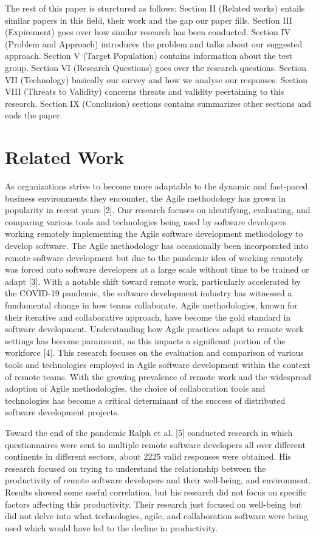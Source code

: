 \documentclass[conference]{IEEEtran}
\begin{document}
The rest of this paper is sturctured as follows: Section II (Related works) entails similar papers in this field, their work and the gap our paper fills. Section III (Expirement) goes over how similar research has been conducted. Section IV (Problem and Approach) introduces the problem and talks about our suggested approach. Section V (Target Population) contains information about the test group. Section VI (Research Questions) goes over the research questions. Section VII (Technology) basically our survey and how we analyse our responses. Section VIII (Threats to Validity) concerns threats and validity peertaining to this research. Section IX (Conclusion) sections contains summarizes other sections and ends the paper.

\section{Related Work}
As organizations strive to become more adaptable to the dynamic and fast-paced business environments they encounter, the Agile methodology has grown in popularity in recent years [2]. Our research focuses on identifying, evaluating, and comparing various tools and technologies being used by software developers working remotely implementing the Agile software development methodology to develop software. The Agile methodology has occasionally been incorporated into remote software development but due to the pandemic idea of working remotely was forced onto software developers at a large scale without time to be trained or adapt [3]. With a notable shift toward remote work, particularly accelerated by the COVID-19 pandemic, the software development industry has witnessed a fundamental change in how teams collaborate. Agile methodologies, known for their iterative and collaborative approach, have become the gold standard in software development. Understanding how Agile practices adapt to remote work settings has become paramount, as this impacts a significant portion of the workforce [4]. This research focuses on the evaluation and comparison of various tools and technologies employed in Agile software development within the context of remote teams. With the growing prevalence of remote work and the widespread adoption of Agile methodologies, the choice of collaboration tools and technologies has become a critical determinant of the success of distributed software development projects.

Toward the end of the pandemic Ralph et al. [5] conducted research in which questionnaires were sent to multiple remote software developers all over different continents in different sectors, about 2225 valid responses were obtained. His research focused on trying to understand the relationship between the productivity of remote software developers and their well-being, and environment. Results showed some useful correlation, but his research did not focus on specific factors affecting this productivity. Their research just focused on well-being but did not delve into what technologies, agile, and collaboration software were being used which would have led to the decline in productivity. 
\end{document}
